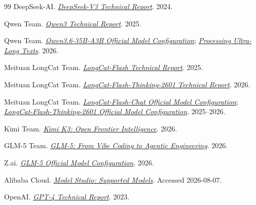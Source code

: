 \documentclass[UTF8,fontset=none,a4paper,10pt]{ctexart}
\begin{document}
\begin{thebibliography}{99}
DeepSeek-AI. \href{https://arxiv.org/abs/2412.19437}{\textit{DeepSeek-V3 Technical Report}}. 2024.

Qwen Team. \href{https://arxiv.org/abs/2505.09388}{\textit{Qwen3 Technical Report}}. 2025.

Qwen Team. \href{https://huggingface.co/Qwen/Qwen3.6-35B-A3B-FP8/blob/main/config.json}{\textit{Qwen3.6-35B-A3B Official Model Configuration}}; \href{https://huggingface.co/Qwen/Qwen3.6-35B-A3B/blob/main/README.md}{\textit{Processing Ultra-Long Texts}}. 2026.

Meituan LongCat Team. \href{https://arxiv.org/abs/2509.01322}{\textit{LongCat-Flash Technical Report}}. 2025.

Meituan LongCat Team. \href{https://arxiv.org/abs/2601.16725}{\textit{LongCat-Flash-Thinking-2601 Technical Report}}. 2026.

Meituan LongCat Team. \href{https://huggingface.co/meituan-longcat/LongCat-Flash-Chat/blob/main/config.json}{\textit{LongCat-Flash-Chat Official Model Configuration}}; \href{https://huggingface.co/meituan-longcat/LongCat-Flash-Thinking-2601-FP8/blob/main/config.json}{\textit{LongCat-Flash-Thinking-2601 Official Model Configuration}}. 2025--2026.

Kimi Team. \href{https://arxiv.org/abs/2607.24653}{\textit{Kimi K3: Open Frontier Intelligence}}. 2026.

GLM-5 Team. \href{https://arxiv.org/abs/2602.15763}{\textit{GLM-5: From Vibe Coding to Agentic Engineering}}. 2026.

Z.ai. \href{https://huggingface.co/zai-org/GLM-5/blob/main/config.json}{\textit{GLM-5 Official Model Configuration}}. 2026.

Alibaba Cloud. \href{https://help.aliyun.com/en/model-studio/models}{\textit{Model Studio: Supported Models}}. Accessed 2026-08-07.

OpenAI. \href{https://arxiv.org/abs/2303.08774}{\textit{GPT-4 Technical Report}}. 2023.

\end{thebibliography}
\clearpage
{}
\setcounter{section}{0}
\setcounter{subsection}{0}
\setcounter{subsubsection}{0}
\setcounter{equation}{0}
\setcounter{figure}{0}
\setcounter{table}{0}
\setcounter{footnote}{0}
\end{document}
